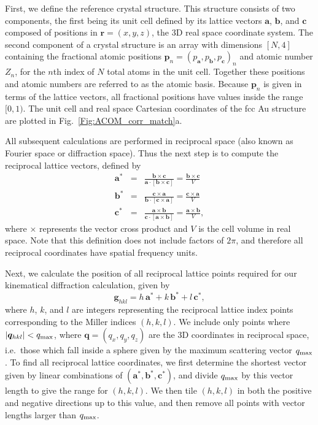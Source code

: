 \documentclass[%
 superscriptaddress,
 aip,
 amsmath,amssymb,
reprint,%
 author-year,%
longbibliography
]{revtex4-2}
\begin{document}
First, we define the reference crystal structure. This structure consists of two components, the first being its unit cell defined by its lattice vectors $\bm{a}$, $\bm{b}$, and $\bm{c}$ composed of positions in $\bm{r}=(x,y,z)$, the 3D real space coordinate system. The second component of a crystal structure is an array with dimensions $[N, 4]$ containing the fractional atomic positions $\bm{p}_n = (p_{\bm{a}}, p_{\bm{b}}, p_{\bm{c}})_n$ and atomic number $Z_n$, for the $n$th index of $N$ total atoms in the unit cell. Together these positions and atomic numbers are referred to as the atomic basis. Because $\bm{p}_n$ is given in terms of the lattice vectors, all fractional positions have values inside the range $[0, 1)$. The unit cell and real space Cartesian coordinates of the fcc Au structure are plotted in Fig.~\ref{Fig:ACOM_corr_match}a.

All subsequent calculations are performed in reciprocal space (also known as Fourier space or diffraction space). Thus the next step is to compute the reciprocal lattice vectors, defined by \citep{gibbs1884elements}
\begin{eqnarray}
    \bm{a}^*
&=&
    \frac{\bm{b} \times \bm{c}}{
    \bm{a} \cdot [\bm{b} \times \bm{c}]}
    =
    \frac{\bm{b} \times \bm{c}}{V}
    \nonumber 
    \\
    \bm{b}^*
&=&
    \frac{\bm{c} \times \bm{a}}{
    \bm{b} \cdot [\bm{c} \times \bm{a}]}
    =
    \frac{\bm{c} \times \bm{a}}{V}
    \nonumber 
    \\
    \bm{c}^*
&=&
    \frac{\bm{a} \times \bm{b}}{
    \bm{c} \cdot [\bm{a} \times \bm{b}]}
    =
    \frac{\bm{a} \times \bm{b}}{V},
\end{eqnarray}
where $\times$ represents the vector cross product and $V$ is the cell volume in real space. Note that this definition does not include factors of $2\pi$, and therefore all reciprocal coordinates have spatial frequency units. 


Next, we calculate the position of all reciprocal lattice points required for our kinematical diffraction calculation, given by
\begin{equation}
    \bm{g}_{hkl} 
    =
    h \, \bm{a}^* + 
    k \, \bm{b}^* + 
    l \, \bm{c}^*,
\end{equation}
where $h$, $k$, and $l$ are integers representing the reciprocal lattice index points corresponding to the Miller indices $(h,k,l)$. We include only points where $|\bm{q}_{hkl}| < q_{\rm{max}}$, where $\bm{q}=(q_x,q_y,q_z)$ are the 3D coordinates in reciprocal space, i.e.\ those which fall inside a sphere given by the maximum scattering vector $q_{\rm{max}}$. To find all reciprocal lattice coordinates, we first determine the shortest vector given by linear combinations of $(\bm{a}^*,\bm{b}^*,\bm{c}^*)$, and divide $q_{\rm{max}}$ by this vector length to give the range for $(h,k,l)$. We then tile $(h,k,l)$ in both the positive and negative directions up to this value, and then remove all points with vector lengths larger than $q_{\rm{max}}$.
\end{document}
